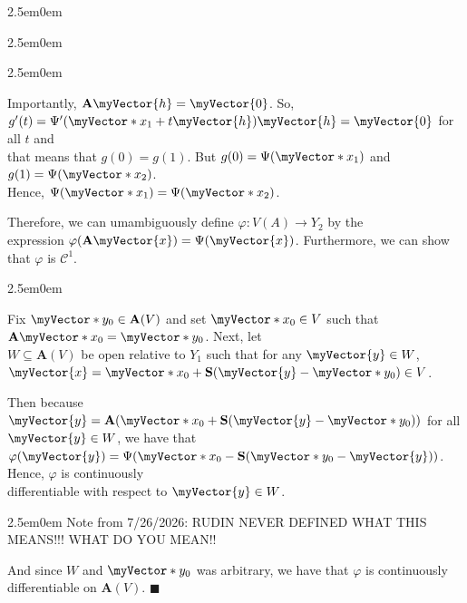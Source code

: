 \documentclass{book}
\newcommand{\hFour}{%
   \color{Cerulean}
   \fontsize{12}{14}\selectfont%
}
\newcommand{\teachComment}{
   \color{Orange}%
   \fontsize{12}{14}\selectfont%
}
\newenvironment{myIndent}{%
   \begin{adjustwidth}{2.5em}{0em}%
}{%
   \end{adjustwidth}%
}
\newcommand{\mySepOne}[1][.]{%
   {\noindent\color{#1}{\rule{6.5in}{1mm}}}\\%
}
\newcommand{\retTwo}{\hfill\bigbreak}
\newcommand{\mVec}[1]{\myVector{#1}}
\newcommand{\mVecAst}[1]{\myVector*{#1}}
\newcommand{\mMat}[1]{\mathbf{#1}}
\begin{document}
{\begin{myIndent}
{\begin{myIndent}
{\begin{myIndent}
         Importantly, $\mMat{A}\mVec{h} = \mVec{0}$. So, $g^\prime(t) = \Psi^\prime(\mVecAst{x}_1 + t\mVec{h})\mVec{h} = \mVec{0}$ for all $t$ and\\ that means that $g(0) = g(1)$. But $g(0)= \Psi(\mVecAst{x}_1)$ and $g(1) = \Psi(\mVecAst{x}_2)$.\\ Hence, $\Psi(\mVecAst{x}_1) = \Psi(\mVecAst{x}_2)$.\retTwo
      \end{myIndent}}

      Therefore, we can umambiguously define $\varphi: V(A) \longrightarrow Y_2$ by the\\ expression $\varphi(\mMat{A}\mVec{x}) = \Psi(\mVec{x})$. Furthermore, we can show that $\varphi$ is $\mathscr{C}^1$.
      {\begin{myIndent}\hFour
         Fix $\mVecAst{y}_0 \in \mMat{A}(V)$ and set $\mVecAst{x}_0 \in V$ such that $\mMat{A}\mVecAst{x}_0 = \mVecAst{y}_0$. Next, let\\ $W \subseteq \mMat{A}(V)$ be open relative to $Y_1$ such that for any $\mVec{y} \in W$,\\ $\mVec{x} = \mVecAst{x}_0 + \mMat{S}(\mVec{y} - \mVecAst{y}_0) \in V$.\retTwo

         Then because $\mVec{y} = \mMat{A}(\mVecAst{x}_0 + \mMat{S}(\mVec{y} - \mVecAst{y}_0))$ for all $\mVec{y} \in W$, we have that\\ $\varphi(\mVec{y}) = \Psi(\mVecAst{x}_0 - \mMat{S}(\mVecAst{y}_0 - \mVec{y}))$. Hence, $\varphi$ is continuously\\ differentiable with respect to $\mVec{y} \in W$.
			\begin{myIndent}\color{red}
				Note from 7/26/2026: RUDIN NEVER DEFINED WHAT THIS MEANS!!! WHAT DO YOU MEAN!!\retTwo
			\end{myIndent}
			
			And since $W$ and $\mVecAst{y}_0$ was arbitrary, we have that $\varphi$ is continuously differentiable on $\mMat{A}(V)$. $\blacksquare$\retTwo
      \end{myIndent}}
   \end{myIndent}}
   


\end{myIndent}}
\color{red}\mySepOne\newpage
\end{document}
